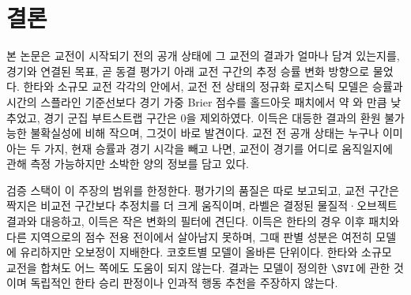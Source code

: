\section{결론}
\label{sec:disc-conclusion}

본 논문은 교전이 시작되기 전의 공개 상태에 그 교전의 결과가 얼마나 담겨 있는지를, 경기와 연결된 목표, 곧 동결 평가기 아래 교전 구간의 추정 승률 변화 방향으로 물었다. 한타와 소규모 교전 각각의 안에서, 교전 전 상태의 정규화 로지스틱 모델은 승률과 시간의 스플라인 기준선보다 경기 가중 Brier 점수를 홀드아웃 패치에서 약 \dBrierT{}와 \dBrierS{}만큼 낮추었고, 경기 군집 부트스트랩 구간은 0을 제외하였다. 이득은 대등한 결과의 환원 불가능한 불확실성에 비해 작으며, 그것이 바로 발견이다. 교전 전 공개 상태는 누구나 이미 아는 두 가지, 현재 승률과 경기 시각을 빼고 나면, 교전이 경기를 어디로 움직일지에 관해 측정 가능하지만 소박한 양의 정보를 담고 있다.

검증 스택이 이 주장의 범위를 한정한다. 평가기의 품질은 따로 보고되고, 교전 구간은 짝지은 비교전 구간보다 추정치를 더 크게 움직이며, 라벨은 결정된 물질적·오브젝트 결과와 대응하고, 이득은 작은 변화의 필터에 견딘다. 이득은 한타의 경우 이후 패치와 다른 지역으로의 점수 전용 전이에서 살아남지 못하며, 그때 판별 성분은 여전히 모델에 유리하지만 오보정이 지배한다. 코호트별 모델이 올바른 단위이다. 한타와 소규모 교전을 합쳐도 어느 쪽에도 도움이 되지 않는다. 결과는 모델이 정의한 $\SVI$에 관한 것이며 독립적인 한타 승리 판정이나 인과적 행동 추천을 주장하지 않는다.
